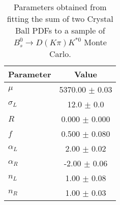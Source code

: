 \begin{table}[h]
  \centering
  \begin{tabular}{lc}
      \toprule
      Parameter & Value \\
      \midrule
      $\mu$ & 5370.00 $\pm$ 0.03 \\
      $\sigma_L$ & 12.0 $\pm$ 0.0 \\
      $R$ & 0.000 $\pm$ 0.000 \\
      $f$ & 0.500 $\pm$ 0.080 \\
      $\alpha_L$ & 2.00 $\pm$ 0.02 \\
      $\alpha_R$ & -2.00 $\pm$ 0.06 \\
      $n_L$ & 1.00 $\pm$ 0.08 \\
      $n_R$ & 1.00 $\pm$ 0.03 \\
  \bottomrule
  \end{tabular}
  \caption{Parameters obtained from fitting the sum of two Crystal Ball PDFs to a sample of $B^0_s \to D(K\pi)K^{*0}$ Monte Carlo.}
\label{tab:signal_Bs_MC_params}
\end{table}
